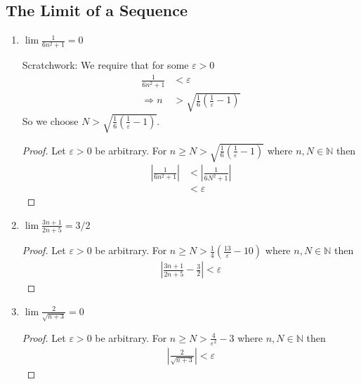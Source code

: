 \subsection{The Limit of a Sequence}

\begin{enumerate}[label=(\alph*)]
    \item 
    $\lim \frac{1}{6n^2+1} = 0$

    Scratchwork: We require that for some $\varepsilon > 0$
    \begin{align*}
        \frac{1}{6n^2+1} &< \varepsilon \\
        \Rightarrow n &> \sqrt{\frac{1}{6}\left( \frac{1}{\varepsilon} - 1 \right)}
    \end{align*}
    So we choose $N > \sqrt{\frac{1}{6}\left( \frac{1}{\varepsilon} - 1 \right)}$.

    \begin{proof}
        Let $\varepsilon>0$ be arbitrary. 
        For $n \geq N > \sqrt{\frac{1}{6}\left( \frac{1}{\varepsilon} - 1 \right)}$ where $n, N\in \mathbb N$
        then
        \begin{align*}
            \left| \frac{1}{6n^2+1}\right| &< \left| \frac{1}{6N^2+1}\right| \\
                                            &< \varepsilon
        \end{align*}
        
    \end{proof}

    \item 
    $\lim \frac{3n+1}{2n+5} = 3/2$

    \begin{proof}
        Let $\varepsilon>0$ be arbitrary. 
        For $n \geq N > \frac{1}{4}\left( \frac{13}{\varepsilon} - 10 \right)$ where $n, N\in \mathbb N$
        then
        \begin{align*}
            \left|  \frac{3n+1}{2n+5} - \frac{3}{2} \right| < \varepsilon
        \end{align*}
    \end{proof}

    \item
    $\lim \frac{2}{\sqrt{n+3}} = 0$

    \begin{proof}
        Let $\varepsilon>0$ be arbitrary. 
        For $n \geq N > \frac{4}{\varepsilon^2}-3$ where $n, N\in \mathbb N$
        then
        \begin{align*}
            \left|  \frac{2}{\sqrt{n+3}} \right| < \varepsilon
        \end{align*}
    \end{proof}
\end{enumerate}

